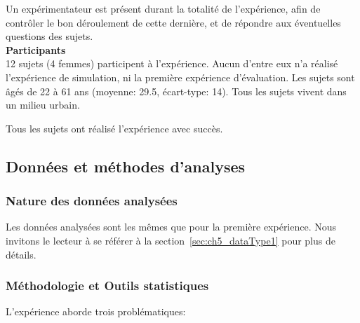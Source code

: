 Un expérimentateur est présent durant la totalité de l'expérience, afin de contrôler le bon déroulement de cette dernière, et de répondre aux éventuelles questions des sujets.  \\

\textbf{Participants} \\

12 sujets (4 femmes) participent à l'expérience. Aucun d'entre eux n'a réalisé l'expérience de simulation, ni la première expérience d'évaluation. Les sujets sont âgés de 22 à 61 ans (moyenne: 29.5, écart-type: 14). Tous les sujets vivent dans un milieu urbain.

Tous les sujets ont réalisé l'expérience avec succès.

\subsection{Données et méthodes d'analyses}

\subsubsection{Nature des données analysées}

Les données analysées sont les mêmes que pour la première expérience. Nous invitons le lecteur à se référer à la section~\ref{sec:ch5_dataType1} pour plus de détails.
 
\subsubsection{Méthodologie et Outils statistiques}
\label{sec:ch5_methodoEtStat2}

L'expérience aborde trois problématiques:

